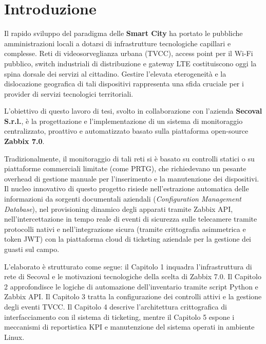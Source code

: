 \documentclass[12pt, a4paper]{report}
\begin{document}
\clearpage

\tableofcontents
\clearpage

\chapter*{Introduzione}
Il rapido sviluppo del paradigma delle \textbf{Smart City} ha portato le pubbliche amministrazioni locali a dotarsi di infrastrutture tecnologiche capillari e complesse. Reti di videosorveglianza urbana (TVCC), access point per il Wi-Fi pubblico, switch industriali di distribuzione e gateway LTE costituiscono oggi la spina dorsale dei servizi al cittadino. Gestire l'elevata eterogeneit\`a e la dislocazione geografica di tali dispositivi rappresenta una sfida cruciale per i provider di servizi tecnologici territoriali.

L'obiettivo di questo lavoro di tesi, svolto in collaborazione con l'azienda \textbf{Secoval S.r.l.}, \`e la progettazione e l'implementazione di un sistema di monitoraggio centralizzato, proattivo e automatizzato basato sulla piattaforma open-source \textbf{Zabbix 7.0}. 

Tradizionalmente, il monitoraggio di tali reti si \`e basato su controlli statici o su piattaforme commerciali limitate (come PRTG), che richiedevano un pesante overhead di gestione manuale per l'inserimento e la manutenzione dei dispositivi. Il nucleo innovativo di questo progetto risiede nell'estrazione automatica delle informazioni da sorgenti documentali aziendali (\textit{Configuration Management Database}), nel provisioning dinamico degli apparati tramite Zabbix API, nell'intercettazione in tempo reale di eventi di sicurezza sulle telecamere tramite protocolli nativi e nell'integrazione sicura (tramite crittografia asimmetrica e token JWT) con la piattaforma cloud di ticketing aziendale per la gestione dei guasti sul campo.

L'elaborato \`e strutturato come segue: il Capitolo 1 inquadra l'infrastruttura di rete di Secoval e le motivazioni tecnologiche della scelta di Zabbix 7.0. Il Capitolo 2 approfondisce le logiche di automazione dell'inventario tramite script Python e Zabbix API. Il Capitolo 3 tratta la configurazione dei controlli attivi e la gestione degli eventi TVCC. Il Capitolo 4 descrive l'architettura crittografica di interfacciamento con il sistema di ticketing, mentre il Capitolo 5 espone i meccanismi di reportistica KPI e manutenzione del sistema operati in ambiente Linux.
\end{document}

